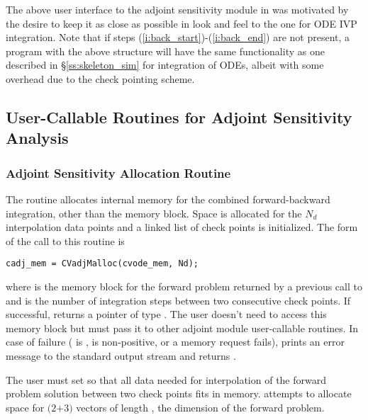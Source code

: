 The above user interface to the adjoint sensitivity module in {\cvodes} was motivated by
the desire to keep it as close as possible in look and feel to the one for ODE IVP 
integration. Note that if steps (\ref{i:back_start})-(\ref{i:back_end}) are not present, 
a program with the above structure will have the same functionality as one described in
\S\ref{ss:skeleton_sim} for integration of ODEs, albeit with some overhead due to 
the check pointing scheme.

\subsection{User-Callable Routines for Adjoint Sensitivity Analysis}

\subsubsection{Adjoint Sensitivity Allocation Routine}\label{sss:cvadjmalloc}

The routine  allocates internal memory for the combined
forward-backward integration, other than the {\cvodes} memory block. Space is allocated 
for the $N_d$ interpolation data points and a linked list of check points is 
initialized.
The form of the call to this routine is
\begin{verbatim}
cadj_mem = CVadjMalloc(cvode_mem, Nd);
\end{verbatim}
where  is the {\cvodes} memory block for the forward problem
returned by a previous call to  and  is the number of
integration steps between two consecutive check points.
If successful,  returns a pointer of type . The user
doesn't need to access this memory block but must pass it to other adjoint module
user-callable routines. In case of failure ( is ,  is
non-positive, or a memory request fails),  prints an error
message to the standard output stream  and returns .

The user must set  so that all data needed for interpolation of the 
forward problem solution between two check points fits in memory. 
attempts to allocate space for $(2$$+3)$ vectors of length , the
dimension of the forward problem.

